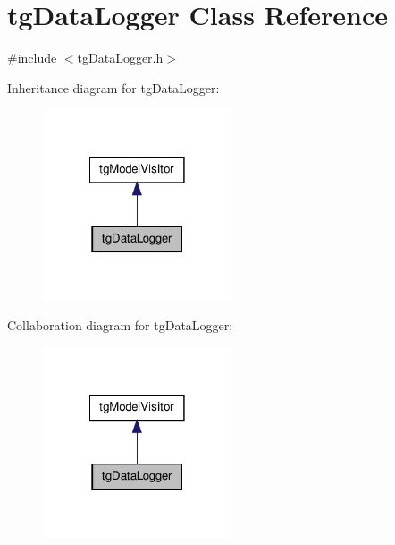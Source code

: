 \hypertarget{classtg_data_logger}{\section{tg\-Data\-Logger Class Reference}
\label{classtg_data_logger}
}


{\ttfamily \#include $<$tg\-Data\-Logger.\-h$>$}



Inheritance diagram for tg\-Data\-Logger\-:\nopagebreak
\begin{figure}[H]
\begin{center}
\leavevmode
\includegraphics[width=158pt]{classtg_data_logger__inherit__graph}
\end{center}
\end{figure}


Collaboration diagram for tg\-Data\-Logger\-:\nopagebreak
\begin{figure}[H]
\begin{center}
\leavevmode
\includegraphics[width=158pt]{classtg_data_logger__coll__graph}
\end{center}
\end{figure}
